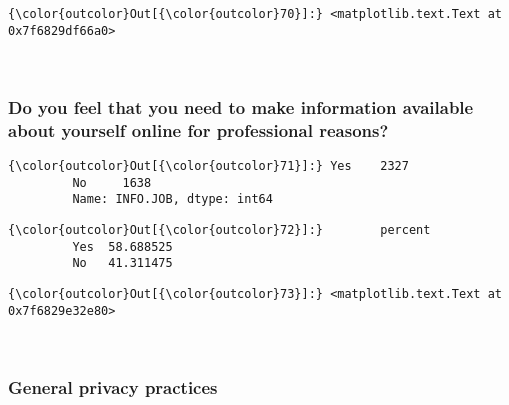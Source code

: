 \documentclass[11pt]{article}
\begin{document}
            \begin{Verbatim}[commandchars=\\\{\}]
{\color{outcolor}Out[{\color{outcolor}70}]:} <matplotlib.text.Text at 0x7f6829df66a0>
\end{Verbatim}
        
    \begin{center}
    \end{center}
    { \hspace*{\fill} \\}
    
    \subsubsection{Do you feel that you need to make information available
about yourself online for professional
reasons?}\label{do-you-feel-that-you-need-to-make-information-available-about-yourself-online-for-professional-reasons}


            \begin{Verbatim}[commandchars=\\\{\}]
{\color{outcolor}Out[{\color{outcolor}71}]:} Yes    2327
         No     1638
         Name: INFO.JOB, dtype: int64
\end{Verbatim}
        

            \begin{Verbatim}[commandchars=\\\{\}]
{\color{outcolor}Out[{\color{outcolor}72}]:}        percent
         Yes  58.688525
         No   41.311475
\end{Verbatim}
        

            \begin{Verbatim}[commandchars=\\\{\}]
{\color{outcolor}Out[{\color{outcolor}73}]:} <matplotlib.text.Text at 0x7f6829e32e80>
\end{Verbatim}
        
    \begin{center}
    \end{center}
    { \hspace*{\fill} \\}
    
    \subsubsection{General privacy
practices}\label{general-privacy-practices}
\end{document}
